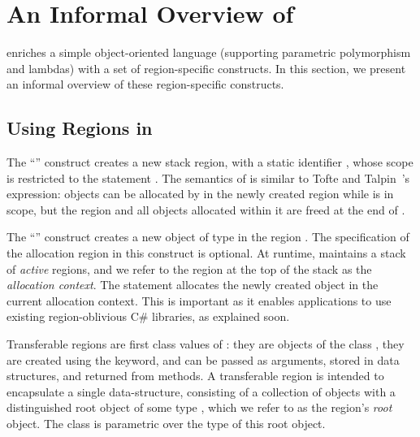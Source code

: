 \newcommand{\COMMENT}[1]{}

\section{An Informal Overview of \name} \label{sec:overview}

\name enriches a simple object-oriented language (supporting
parametric polymorphism and lambdas) with a set of region-specific
constructs.  In this section, we present an informal overview of these
region-specific constructs.

\subsection{Using Regions in \name}
\label{sec:alloc-ctxt}

 The ``'' construct
creates a new stack region, with a static identifier , whose
scope is restricted to the statement . The semantics of
 is similar to Tofte and Talpin~\cite{tofte94}'s
 expression: objects can be allocated by  in the
newly created region while  is in scope, but the region and all
objects allocated within it are freed at the end of .

 The ``'' construct creates
a new object of type  in the region . The specification of
the allocation region  in this construct is optional.  At
runtime, \name maintains a stack of \emph{active} regions, and we
refer to the region at the top of the stack as the \emph{allocation
context}. The statement  allocates the newly created object
in the current allocation context.
%
This is important as it enables \name applications to use existing
region-oblivious C\# libraries, as explained soon.


%
Transferable regions are first class values of \name: they are objects
of the class , they are created using the  keyword,
and can be passed as arguments, stored in data structures, and
returned from methods.  A transferable region is intended to
encapsulate a single data-structure, consisting of a collection of
objects with a distinguished root object of some type , which we
refer to as the region's \emph{root} object.  The class  is
parametric over the type  of this root object.

